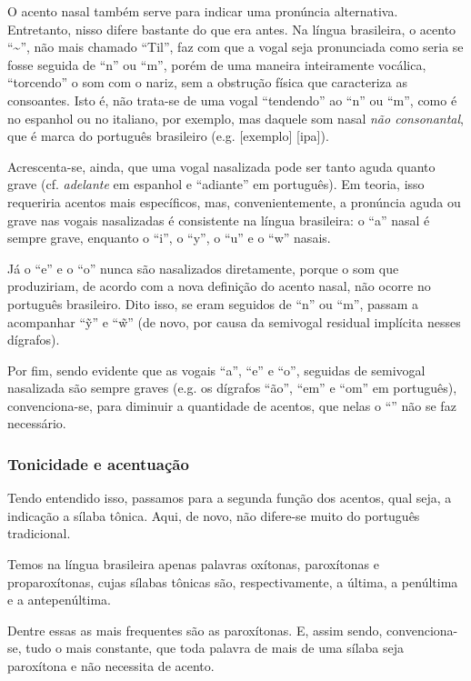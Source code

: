 \documentclass[12pt, a5paper, titlepage]{article}
\begin{document}
O acento nasal também serve para indicar uma pronúncia alternativa. Entretanto,
nisso difere bastante do que era antes. Na língua brasileira, o acento
``\textasciitilde'', não mais chamado ``Til'', faz com que a vogal seja
pronunciada como seria se fosse seguida de ``n'' ou ``m'', porém de uma maneira
inteiramente vocálica, ``torcendo'' o som com o nariz, sem a obstrução física
que caracteriza as consoantes. Isto é, não trata-se de uma vogal ``tendendo''
ao ``n'' ou ``m'', como é no espanhol ou no italiano, por exemplo, mas daquele
som nasal \textit{não consonantal}, que é marca do português brasileiro (e.g. [exemplo] [ipa]).

Acrescenta-se, ainda, que uma vogal nasalizada pode ser tanto aguda quanto
grave (cf. \textit{adelante} em espanhol e ``adiante'' em português). Em
teoria, isso requeriria acentos mais específicos, mas, convenientemente, a
pronúncia aguda ou grave nas vogais nasalizadas é consistente na língua
brasileira: o ``a'' nasal é sempre grave, enquanto o ``i'', o ``y'', o ``u'' e o ``w'' nasais.

Já o ``e'' e o ``o'' nunca são
nasalizados diretamente, porque o som que produziriam, de acordo com a nova
definição do acento nasal, não ocorre no português brasileiro. Dito isso, se eram seguidos de ``n'' ou ``m'', passam a acompanhar ``\~y'' e ``\~w''
(de novo, por causa da semivogal residual implícita nesses dígrafos).

Por fim, sendo evidente que as vogais ``a'', ``e'' e ``o'', seguidas de semivogal nasalizada são sempre graves (e.g. os dígrafos ``ão'', ``em'' e ``om'' em português), convenciona-se, para diminuir a quantidade de acentos, que nelas o ``\textasciigrave'' não se faz necessário.

\subsubsection{Tonicidade e acentuação}
Tendo entendido isso, passamos para a segunda função dos acentos, qual seja, a indicação a sílaba tônica. Aqui, de novo, não difere-se muito do português tradicional.

Temos na língua brasileira apenas palavras oxítonas, paroxítonas e proparoxítonas, cujas sílabas tônicas são, respectivamente, a última, a penúltima e a antepenúltima.

Dentre essas as mais frequentes são as paroxítonas. E, assim sendo, convenciona-se, tudo o mais constante, que toda palavra de mais de uma sílaba seja paroxítona e não necessita de acento.
\end{document}
